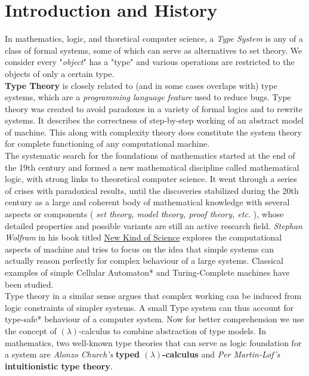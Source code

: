 \chapter{Introduction and History }

In mathematics, logic, and thoretical computer science, a \textit{Type System} is any of a class of formal systems, some of which can serve as alternatives to set theory. We consider every "\textit{object}" has a "type" and various operations are restricted to the objects of only a certain type.\\

\textbf{Type Theory} is closely related to (and in some cases overlaps with) type systems, which are a \textit{programming language feature} used to reduce bugs. Type theory was created to avoid paradoxes in a variety of formal logics and to rewrite systems. It describes the correctness of step-by-step working of an abstract model of machine. This along with complexity theory does constitute the system theory for complete functioning of any computational machine.\\

The systematic search for the foundations of mathematics started at the end of the 19th century and formed a new mathematical discipline called mathematical logic, with strong links to theoretical computer science. It went through a series of crises with paradoxical results, until the discoveries stabilized during the 20th century as a large and coherent body of mathematical knowledge with several aspects or components ( \textit{set theory, model theory, proof theory, etc.} ), whose detailed properties and possible variants are still an active research field. \textit{Stephan Wolfram} in his book titled \underline{New Kind of Science} explores the computational aspects of machine and tries to focus on the idea that simple systems can actually reason perfectly for complex behaviour of a large systems. Classical examples of simple Cellular Automaton* and Turing-Complete machines have been studied.\\

Type theory in a similar sense argues that complex working can be induced from logic constraints of simpler systems. A small Type system can thus account for type-safe* behaviour of a computer system. Now for better comprehension we use the concept of $(\lambda)$-calculus to combine abstraction of type models. In mathematics, two well-known type theories that can serve as logic foundation for a system are \textit{Alonzo Church's} \textbf{ typed $(\lambda)$-calculus} and \textit{Per Martin-Lof's } \textbf{intuitionistic type theory}. 

